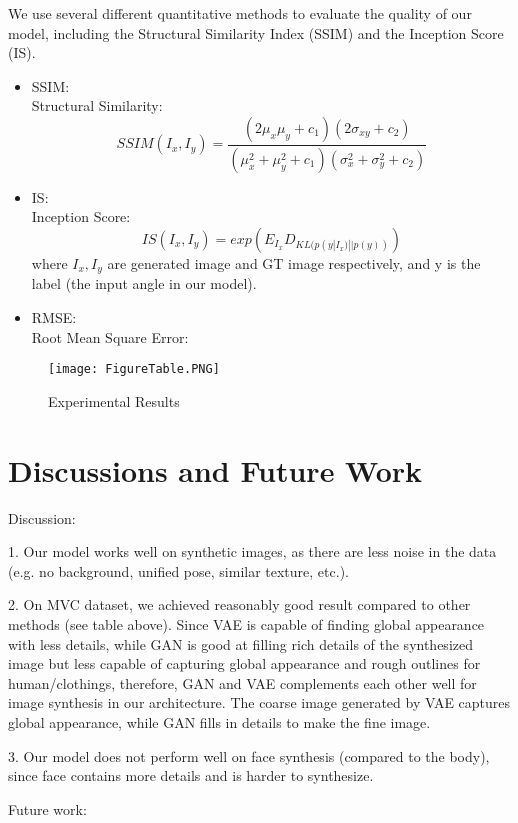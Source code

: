 \documentclass[10pt,conference]{IEEEtran}
\begin{document}
We use several different quantitative methods to evaluate the quality of our model, including the Structural Similarity Index (SSIM) and the Inception Score (IS).
\begin{itemize}


\item SSIM:\\
Structural Similarity:
$$SSIM(I_x,I_y)=\frac{(2\mu_x \mu_y + c_1)(2\sigma_{xy}+c_2)}{(\mu_x^2+\mu_y^2 +c_1)(\sigma_x^2+\sigma_y^2+c_2)}$$

\item IS:\\
Inception Score:
$$IS(I_x,I_y)=exp(E_{I_x}D_{KL(p(y|I_x)||p(y))})$$
where $I_x,I_y$ are generated image and GT image respectively, and y is the label (the input angle in our model).

\item RMSE:\\
Root Mean Square Error:


\end{itemize}

\begin{figure*}
  \texttt{[image: FigureTable.PNG]}
  \caption{Experimental Results}
  \label{fig:boat1}
\end{figure*}

\section{Discussions and Future Work}

Discussion:

1. Our model works well on synthetic images, as there are less noise in the data (e.g. no background, unified pose, similar texture, etc.).

2. On MVC dataset, we achieved reasonably good result compared to other methods (see table above). Since VAE is capable of finding 
global appearance with less details, while GAN is good at filling rich details of the synthesized image but less capable of capturing 
global appearance and rough outlines for human/clothings, therefore, GAN and VAE complements each other well for image synthesis 
in our architecture. The coarse image generated by VAE captures global appearance, while GAN fills in details to make the fine image.

3. Our model does not perform well on face synthesis (compared to the body), since face contains more details and is harder to synthesize.

Future work:
\end{document}
